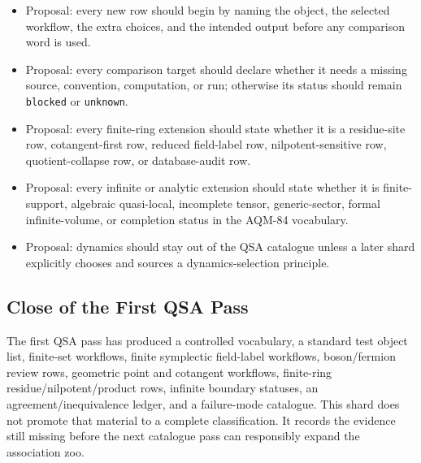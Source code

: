 \begin{itemize}
\item Proposal: every new row should begin by naming the object, the selected
  workflow, the extra choices, and the intended output before any comparison
  word is used.
\item Proposal: every comparison target should declare whether it needs a
  missing source, convention, computation, or run; otherwise its status should
  remain \texttt{blocked} or \texttt{unknown}.
\item Proposal: every finite-ring extension should state whether it is a
  residue-site row, cotangent-first row, reduced field-label row,
  nilpotent-sensitive row, quotient-collapse row, or database-audit row.
\item Proposal: every infinite or analytic extension should state whether it
  is finite-support, algebraic quasi-local, incomplete tensor, generic-sector,
  formal infinite-volume, or completion status in the AQM-84 vocabulary.
\item Proposal: dynamics should stay out of the QSA catalogue unless a later
  shard explicitly chooses and sources a dynamics-selection principle.
\end{itemize}

\subsection{Close of the First QSA Pass}

The first QSA pass has produced a controlled vocabulary, a standard test
object list, finite-set workflows, finite symplectic field-label workflows,
boson/fermion review rows, geometric point and cotangent workflows,
finite-ring residue/nilpotent/product rows, infinite boundary statuses,
an agreement/inequivalence ledger, and a failure-mode catalogue.  This shard
does not promote that material to a complete classification.  It records the
evidence still missing before the next catalogue pass can responsibly expand
the association zoo.
